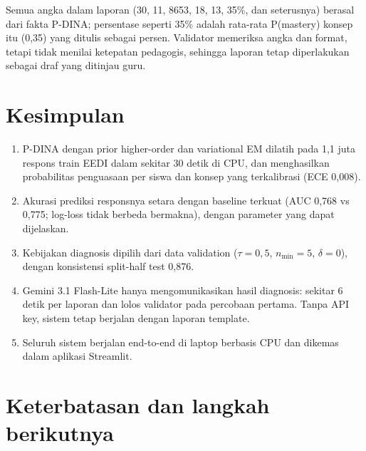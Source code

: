 \documentclass[11pt,a4paper]{article}
\begin{document}
Semua angka dalam laporan (30, 11, 8653, 18, 13, 35\%, dan seterusnya) berasal dari fakta P-DINA; persentase seperti
35\% adalah rata-rata P(mastery) konsep itu (0,35) yang ditulis sebagai persen. Validator memeriksa angka dan format,
tetapi tidak menilai ketepatan pedagogis, sehingga laporan tetap diperlakukan sebagai draf yang ditinjau guru.

\section{Kesimpulan}

\begin{enumerate}
  \item P-DINA dengan prior higher-order dan variational EM dilatih pada 1,1 juta respons train EEDI dalam sekitar
        30 detik di CPU, dan menghasilkan probabilitas penguasaan per siswa dan konsep yang terkalibrasi (ECE 0,008).
  \item Akurasi prediksi responsnya setara dengan baseline terkuat (AUC 0,768 vs 0,775; log-loss tidak berbeda
        bermakna), dengan parameter yang dapat dijelaskan.
  \item Kebijakan diagnosis dipilih dari data validation ($\tau=0{,}5$, $n_{\min}=5$, $\delta=0$), dengan konsistensi
        split-half test 0,876.
  \item Gemini 3.1 Flash-Lite hanya mengomunikasikan hasil diagnosis: sekitar 6 detik per laporan dan lolos validator
        pada percobaan pertama. Tanpa API key, sistem tetap berjalan dengan laporan template.
  \item Seluruh sistem berjalan end-to-end di laptop berbasis CPU dan dikemas dalam aplikasi Streamlit.
\end{enumerate}

\section{Keterbatasan dan langkah berikutnya}
\end{document}
